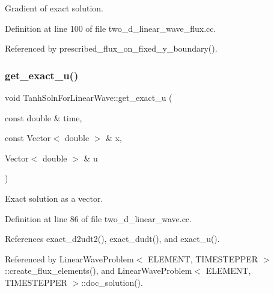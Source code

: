 Gradient of exact solution. 



Definition at line 100 of file two\+\_\+d\+\_\+linear\+\_\+wave\+\_\+flux.\+cc.



Referenced by prescribed\+\_\+flux\+\_\+on\+\_\+fixed\+\_\+y\+\_\+boundary().

\mbox{\label{namespaceTanhSolnForLinearWave_a7dd7e9f155d19f871ba87d3fe41fd8e9}} 
\subsubsection{\texorpdfstring{get\+\_\+exact\+\_\+u()}{get\_exact\_u()}}
{\footnotesize\ttfamily void Tanh\+Soln\+For\+Linear\+Wave\+::get\+\_\+exact\+\_\+u (\begin{DoxyParamCaption}\item[{const double \&}]{time,  }\item[{const Vector$<$ double $>$ \&}]{x,  }\item[{Vector$<$ double $>$ \&}]{u }\end{DoxyParamCaption})}



Exact solution as a vector. 



Definition at line 86 of file two\+\_\+d\+\_\+linear\+\_\+wave.\+cc.



References exact\+\_\+d2udt2(), exact\+\_\+dudt(), and exact\+\_\+u().



Referenced by Linear\+Wave\+Problem$<$ E\+L\+E\+M\+E\+N\+T, T\+I\+M\+E\+S\+T\+E\+P\+P\+E\+R $>$\+::create\+\_\+flux\+\_\+elements(), and Linear\+Wave\+Problem$<$ E\+L\+E\+M\+E\+N\+T, T\+I\+M\+E\+S\+T\+E\+P\+P\+E\+R $>$\+::doc\+\_\+solution().

\mbox{\label{namespaceTanhSolnForLinearWave_a3bc9643b40e62283dc09f405ed17c805}} 
